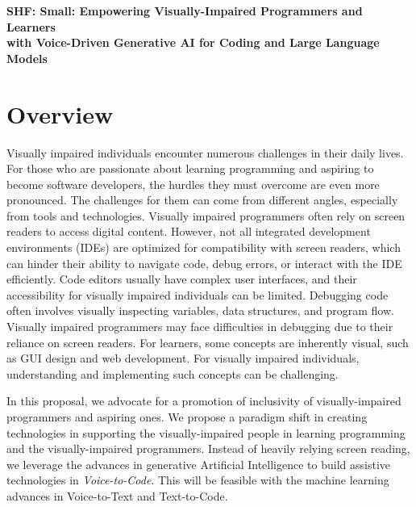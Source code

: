 \documentclass[11pt]{article}
\begin{document}



\begin{center}
{\large \bf SHF: Small: Empowering Visually-Impaired Programmers and Learners\\ with Voice-Driven Generative AI for Coding and Large Language Models}
\end{center}
\vspace{-.1in}



\section{Overview}

Visually impaired individuals encounter numerous challenges in their
daily lives. For those who are passionate about learning programming
and aspiring to become software developers, the hurdles they must
overcome are even more pronounced. The challenges for them can come
from different angles, especially from tools and
technologies. Visually impaired programmers often rely on screen
readers to access digital content. However, not all integrated
development environments (IDEs) are optimized for compatibility with
screen readers, which can hinder their ability to navigate code, debug
errors, or interact with the IDE efficiently. Code editors usually
have complex user interfaces, and their accessibility for visually
impaired individuals can be limited. Debugging code often involves
visually inspecting variables, data structures, and program
flow. Visually impaired programmers may face difficulties in debugging
due to their reliance on screen readers. For learners, some
concepts are inherently visual, such as GUI design and web
development. For visually impaired individuals, understanding and
implementing such concepts can be challenging.

In this proposal, we advocate for a promotion of inclusivity of
visually-impaired programmers and aspiring ones. We propose a paradigm
shift in creating technologies in supporting the visually-impaired
people in learning programming and the visually-impaired
programmers. Instead of heavily relying screen reading, we leverage
the advances in generative Artificial Intelligence to build assistive
technologies in {\em Voice-to-Code}. This will be feasible with the
machine learning advances in Voice-to-Text and Text-to-Code.
\end{document}
